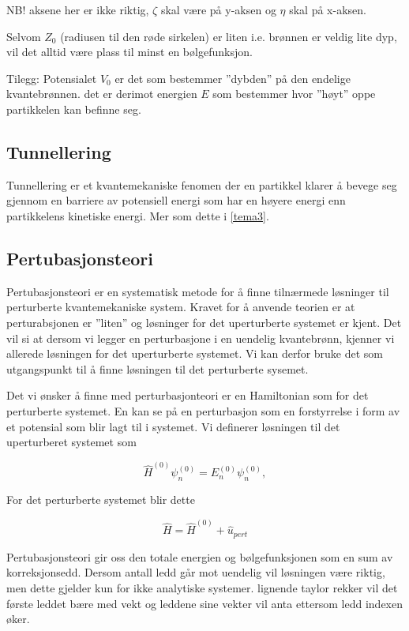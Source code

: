 NB! aksene her er ikke riktig, $\zeta$ skal være på y-aksen og $\eta$ skal på x-aksen.

Selvom $Z_0$ (radiusen til den røde sirkelen) er liten i.e. brønnen er veldig lite dyp, vil det alltid være plass til minst en bølgefunksjon. 

Tilegg: Potensialet  $V_0$ er det som bestemmer ''dybden'' på den endelige kvantebrønnen. det er derimot energien $E$ som bestemmer hvor ''høyt'' oppe partikkelen kan befinne seg.

\subsection{Tunnellering}
\label{sec:tema2_5}
Tunnellering er et kvantemekaniske fenomen der en partikkel klarer å bevege seg gjennom en barriere av potensiell energi som har en høyere energi enn partikkelens kinetiske energi. Mer som dette i \autoref{tema3}.

\subsection{Pertubasjonsteori}
\label{sec:tema2_6}
Pertubasjonsteori er en systematisk metode for å finne tilnærmede løsninger til perturberte kvantemekaniske system. Kravet for å anvende teorien er at perturabsjonen er ''liten'' og løsninger for det uperturberte systemet er kjent. Det vil si at dersom vi legger en perturbasjone i en uendelig kvantebrønn, kjenner vi allerede løsningen for det uperturberte systemet. Vi kan derfor bruke det som utgangspunkt til å finne løsningen til det perturberte sysemet. 

Det vi ønsker å finne med perturbasjonteori er en Hamiltonian som for det perturberte systemet. En kan se på en perturbasjon som en forstyrrelse i form av et potensial som blir lagt til i systemet. Vi definerer løsningen til det uperturberet systemet som 

\begin{equation}
    \label{eq:solUpert}
    \hat{H}^{(0)}\psi_n^{(0)} = E_n^{(0)}\psi_n^{(0)},
\end{equation}

For det perturberte systemet blir dette 

\begin{equation}
    \label{eq:hamPert}
    \hat{H} = \hat{H}^{(0)} + \hat{u}_{pert}
\end{equation}

Pertubasjonsteori gir oss den totale energien og bølgefunksjonen som en sum av korreksjonsedd. Dersom antall ledd går mot uendelig vil løsningen være riktig, men dette gjelder kun for ikke analytiske systemer. lignende taylor rekker vil det første leddet bære med vekt og leddene sine vekter vil anta ettersom ledd indexen øker.

